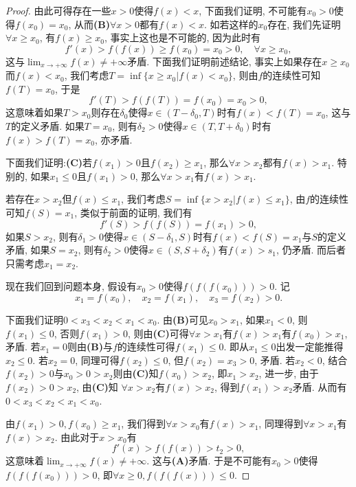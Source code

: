 \begin{quizb}
\begin{proof}
由此可得存在一些\(x>0\)使得\(f(x)<x\), 下面我们证明, 不可能有\(x_0>0\)使得\(f(x_0)=x_0\), 从而\textbf{(B)}\(\forall x>0\)都有\(f(x)<x\). 如若这样的\(x_0\)存在, 我们先证明\(\forall x\geqslant x_0\), 有\(f(x)\geqslant x_0\), 事实上这也是不可能的, 因为此时有\[f'(x)>f\left(f(x)\right)\geqslant f(x_0)=x_0>0,\quad\forall x\geqslant x_0,\]这与\(\lim_{x\rightarrow+\infty}f(x)\ne +\infty\)矛盾. 下面我们证明前述结论, 事实上如果存在\(x\geqslant x_0\)而\(f(x)<x_0\), 我们考虑\(T=\inf\{x\geqslant x_0\big| f(x)<x_0\}\), 则由\(f\)的连续性可知\(f(T)=x_0\), 于是\[f'(T)>f\left(f(T)\right)=f(x_0)=x_0>0,\]这意味着如果\(T>x_0\)则存在\(\delta_0\)使得\(x\in(T-\delta_0,T)\)时有\(f(x)<f(T)=x_0\), 这与\(T\)的定义矛盾. 如果\(T=x_0\), 则有\(\delta_2>0\)使得\(x\in(T,T+\delta_0)\)时有\(f(x)>f(T)=x_0\), 亦矛盾.

下面我们证明:\textbf{(C)}若\(f(x_1)>0\)且\(f(x_2)\geqslant x_1\), 那么\(\forall x>x_2\)都有\(f(x)>x_1\). 特别的, 如果\(x_1\leqslant 0\)且\(f(x_1)> 0\), 那么\(\forall x>x_1\)有\(f(x)>x_1\).

若存在\(x>x_2\)但\(f(x)\leqslant x_1\), 我们考虑\(S=\inf\{x>x_2\big|f(x)\leqslant x_1\}\), 由\(f\)的连续性可知\(f(S)=x_1\), 类似于前面的证明, 我们有\[f'(S)>f\left(f(S)\right)=f(x_1)>0,\]如果\(S>x_2\), 则有\(\delta_1>0\)使得\(x\in(S-\delta_1,S)\)时有\(f(x)<f(S)=x_1\)与\(S\)的定义矛盾, 如果\(S=x_2\), 则有\(\delta_2>0\)使得\(x\in(S,S+\delta_2)\)有\(f(x)>s_1\), 仍矛盾. 而后者只需考虑\(x_1=x_2\).

现在我们回到问题本身, 假设有\(x_0>0\)使得\(f\left(f\left(f(x_0)\right)\right)>0\). 记\[x_1=f(x_0),\quad x_2=f(x_1),\quad x_3=f(x_2)>0.\]

下面我们证明\(0<x_3<x_2<x_1<x_0\). 由\textbf{(B)}可见\(x_0>x_1\), 如果\(x_1<0\), 则\(f(x_1)\leqslant 0\), 否则\(f(x_1)>0\), 则由\textbf{(C)}可得\(\forall x>x_1\)有\(f(x)>x_1\)有\(f(x_0)>x_1\), 矛盾. 若\(x_1=0\)则由\textbf{(B)}与\(f\)的连续性可得\(f(x_1)\leqslant 0\). 即从\(x_1\leqslant 0\)出发一定能推得\(x_2\leqslant 0\). 若\(x_2=0\), 同理可得\(f(x_2)\leqslant 0\), 但\(f(x_2)=x_3>0\), 矛盾. 若\(x_2<0\), 结合\(f(x_2)>0\)与\(x_0>0>x_2\)则由\textbf{(C)}知\(f(x_0)>x_2\), 即\(x_1>x_2\), 进一步, 由于\(f(x_2)>0>x_2\), 由\textbf{(C)}知 \(\forall x>x_2\)有\(f(x)>x_2\), 得到\(f(x_1)>x_2\)矛盾. 从而有\(0<x_3<x_2<x_1<x_0\).

由\(f(x_1)>0,f(x_0)\geqslant x_1\), 我们得到\(\forall x>x_0\)有\(f(x)>x_1\), 同理得到\(\forall x>x_1\)有\(f(x)>x_2\). 由此对于\(x>x_0\)有\[f'(x)>f\left(f(x)\right)>t_2>0,\]
这意味着\(\lim_{x\rightarrow+\infty}f(x)\ne +\infty\).
 这与\textbf{(A)}矛盾. 于是不可能有\(x_0>0\)使得\(f\left(f\left(f(x_0)\right)\right)>0\), 即\(\forall x\geqslant 0,f\left(f\left(f(x)\right)\right)\leqslant 0\).
\end{proof}


\end{quizb}
